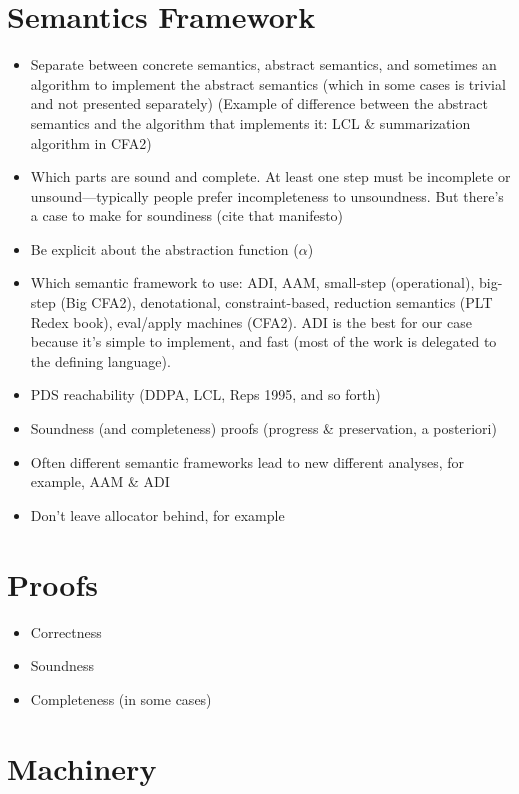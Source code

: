 \documentclass[12pt, oneside]{book}
\begin{document}
\section{Semantics Framework}
\label{section:semantics-framework}

\begin{itemize}
  \item Separate between concrete semantics, abstract semantics, and sometimes an algorithm to implement the abstract semantics (which in some cases is trivial and not presented separately) (Example of difference between the abstract semantics and the algorithm that implements it: LCL \& summarization algorithm in CFA2)
  \item Which parts are sound and complete. At least one step must be incomplete or unsound—typically people prefer incompleteness to unsoundness. But there’s a case to make for soundiness (cite that manifesto)
  \item Be explicit about the abstraction function (\(α\))
  \item Which semantic framework to use: ADI, AAM, small-step (operational), big-step (Big CFA2), denotational, constraint-based, reduction semantics (PLT Redex book), eval/apply machines (CFA2). ADI is the best for our case because it’s simple to implement, and fast (most of the work is delegated to the defining language).
  \item PDS reachability (DDPA, LCL, Reps 1995, and so forth)
  \item Soundness (and completeness) proofs (progress \& preservation, a posteriori)
  \item Often different semantic frameworks lead to new different analyses, for example, AAM \& ADI
  \item Don’t leave allocator behind, for example
\end{itemize}

\section{Proofs}

\begin{itemize}
  \item Correctness
  \item Soundness
  \item Completeness (in some cases)
\end{itemize}

\section{Machinery}
\end{document}
